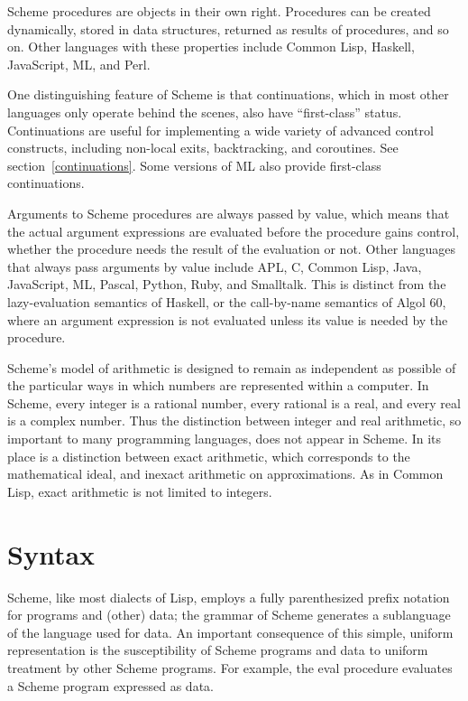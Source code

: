 \vest Scheme procedures are objects in their own right.  Procedures can be
created dynamically, stored in data structures, returned as results of
procedures, and so on.  Other languages with these properties include
Common Lisp, Haskell, JavaScript, ML, and Perl.

\vest One distinguishing feature of Scheme is that continuations, which
in most other languages only operate behind the scenes, also have
``first-class'' status.  Continuations are useful for implementing a
wide variety of advanced control constructs, including non-local exits,
backtracking, and coroutines.  See section~\ref{continuations}.
Some versions of ML also provide first-class continuations.

\vest Arguments to Scheme procedures are always passed by value, which
means that the actual argument expressions are evaluated before the
procedure gains control, whether the procedure needs the result of the
evaluation or not.  Other languages that always
pass arguments by value include
APL, C\sharpsign, Common Lisp, Java, JavaScript, ML, Pascal,
Python, Ruby, and Smalltalk.
This is distinct from the lazy-evaluation semantics of Haskell,
or the call-by-name semantics of Algol 60, where an argument
expression is not evaluated unless its value is needed by the
procedure.


\vest Scheme's model of arithmetic is designed to remain as independent as
possible of the particular ways in which numbers are represented within a
computer. In Scheme, every integer is a rational number, every rational is a
real, and every real is a complex number.  Thus the distinction between integer
and real arithmetic, so important to many programming languages, does not
appear in Scheme.  In its place is a distinction between exact arithmetic,
which corresponds to the mathematical ideal, and inexact arithmetic on
approximations.  As in Common Lisp, exact arithmetic is not limited to
integers.

\section{Syntax}

Scheme, like most dialects of Lisp, employs a fully parenthesized prefix
notation for programs and (other) data; the grammar of Scheme generates a
sublanguage of the language used for data.  An important
consequence of this simple, uniform representation is the susceptibility of
Scheme programs and data to uniform treatment by other Scheme programs.
For example, the {\cf eval} procedure evaluates a Scheme program expressed
as data.

